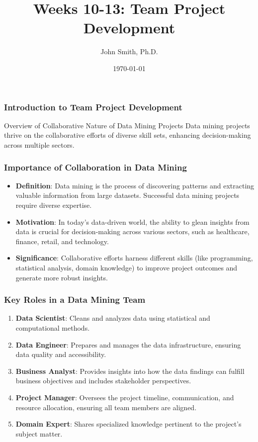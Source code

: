 \documentclass[aspectratio=169]{beamer}
\title{Weeks 10-13: Team Project Development}
\author{John Smith, Ph.D.}
\institute{Department of Computer Science \\ University Name}
\date{\today}
\begin{document}
\frame{\titlepage}

\begin{frame}[fragile]
    \frametitle{Introduction to Team Project Development}
    \begin{block}{Overview of Collaborative Nature of Data Mining Projects}
        Data mining projects thrive on the collaborative efforts of diverse skill sets, enhancing decision-making across multiple sectors.
    \end{block}
\end{frame}

\begin{frame}[fragile]
    \frametitle{Importance of Collaboration in Data Mining}
    \begin{itemize}
        \item \textbf{Definition}: 
        Data mining is the process of discovering patterns and extracting valuable information from large datasets. Successful data mining projects require diverse expertise.
        
        \item \textbf{Motivation}: 
        In today's data-driven world, the ability to glean insights from data is crucial for decision-making across various sectors, such as healthcare, finance, retail, and technology.
        
        \item \textbf{Significance}: 
        Collaborative efforts harness different skills (like programming, statistical analysis, domain knowledge) to improve project outcomes and generate more robust insights.
    \end{itemize}
\end{frame}

\begin{frame}[fragile]
    \frametitle{Key Roles in a Data Mining Team}
    \begin{enumerate}
        \item \textbf{Data Scientist}: Cleans and analyzes data using statistical and computational methods.
        
        \item \textbf{Data Engineer}: Prepares and manages the data infrastructure, ensuring data quality and accessibility.
        
        \item \textbf{Business Analyst}: Provides insights into how the data findings can fulfill business objectives and includes stakeholder perspectives.
        
        \item \textbf{Project Manager}: Oversees the project timeline, communication, and resource allocation, ensuring all team members are aligned.
        
        \item \textbf{Domain Expert}: Shares specialized knowledge pertinent to the project's subject matter.
    \end{enumerate}
\end{frame}
\end{document}
